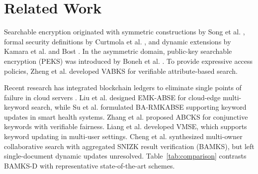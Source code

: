 \documentclass[conference]{IEEEtran}
\begin{document}
\section{Related Work}

Searchable encryption originated with symmetric constructions by Song et al. \cite{song2000practical}, formal security definitions by Curtmola et al. \cite{curtmola2011searchable}, and dynamic extensions by Kamara et al. \cite{kamara2012dynamic} and Bost \cite{bost2016sophos}. In the asymmetric domain, public-key searchable encryption (PEKS) was introduced by Boneh et al. \cite{boneh2004peks}. To provide expressive access policies, Zheng et al. \cite{zheng2014vabks} developed VABKS for verifiable attribute-based search.

Recent research has integrated blockchain ledgers to eliminate single points of failure in cloud servers \cite{wood2024ethereum, benet2014ipfs}. Liu et al. \cite{liu2022emk} designed EMK-ABSE for cloud-edge multi-keyword search, while Su et al. \cite{su2022barmk} formulated BA-RMKABSE supporting keyword updates in smart health systems. Zhang et al. \cite{zhang2023abcks} proposed ABCKS for conjunctive keywords with verifiable fairness. Liang et al. \cite{liang2023vmse} developed VMSE, which supports keyword updating in multi-user settings. Cheng et al. \cite{cheng2026bamks} synthesized multi-owner collaborative search with aggregated SNIZK result verification (BAMKS), but left single-document dynamic updates unresolved. Table~\ref{tab:comparison} contrasts BAMKS-D with representative state-of-the-art schemes.
\end{document}
